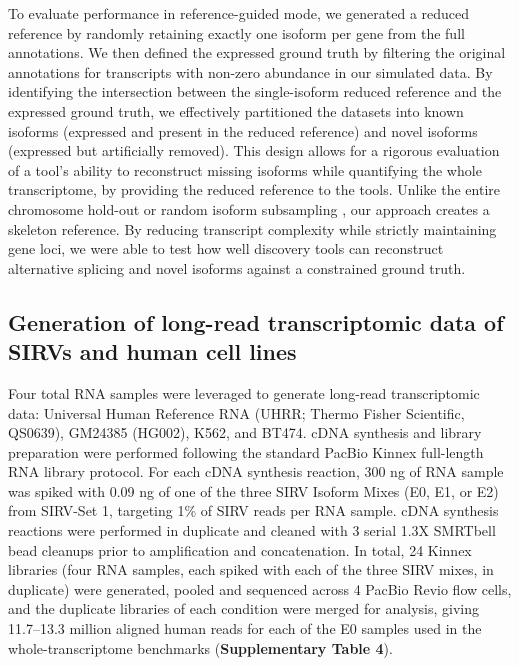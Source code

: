 To evaluate performance in reference-guided mode, we generated a reduced reference by randomly retaining exactly one isoform per gene from the full annotations. We then defined the expressed ground truth by filtering the original annotations for transcripts with non-zero abundance in our simulated data. By identifying the intersection between the single-isoform reduced reference and the expressed ground truth, we effectively partitioned the datasets into known isoforms (expressed and present in the reduced reference) and novel isoforms (expressed but artificially removed). This design allows for a rigorous evaluation of a tool's ability to reconstruct missing isoforms while quantifying the whole transcriptome, by providing the reduced reference to the tools. Unlike the entire chromosome hold-out \citep{chen2023} or random isoform subsampling \citep{pardopalacios2024b}, our approach creates a skeleton reference. By reducing transcript complexity while strictly maintaining gene loci, we were able to test how well discovery tools can reconstruct alternative splicing and novel isoforms against a constrained ground truth.

\subsection{Generation of long-read transcriptomic data of SIRVs and human cell lines}\label{generation-of-long-read-transcriptomic-data-of-sirvs-and-human-cell-lines}

Four total RNA samples were leveraged to generate long-read transcriptomic data: Universal Human Reference RNA (UHRR; Thermo Fisher Scientific, QS0639), GM24385 (HG002), K562, and BT474. cDNA synthesis and library preparation were performed following the standard PacBio Kinnex full-length RNA library protocol. For each cDNA synthesis reaction, 300 ng of RNA sample was spiked with 0.09 ng of one of the three SIRV Isoform Mixes (E0, E1, or E2) from SIRV-Set 1, targeting 1\% of SIRV reads per RNA sample. cDNA synthesis reactions were performed in duplicate and cleaned with 3 serial 1.3X SMRTbell bead cleanups prior to amplification and concatenation. In total, 24 Kinnex libraries (four RNA samples, each spiked with each of the three SIRV mixes, in duplicate) were generated, pooled and sequenced across 4 PacBio Revio flow cells, and the duplicate libraries of each condition were merged for analysis, giving 11.7--13.3 million aligned human reads for each of the E0 samples used in the whole-transcriptome benchmarks (\textbf{Supplementary Table 4}).

